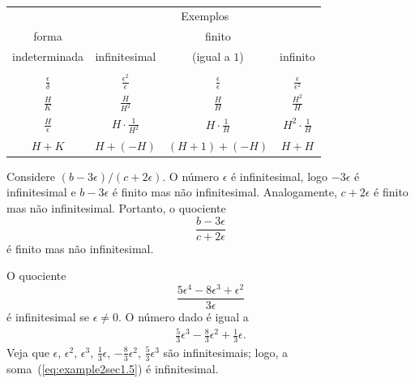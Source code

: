 \begin{table}
\caption{}
\label{tab:indeterminateforms}
\begin{center}
{\everymath{\displaystyle}
\begin{tabular}{c|c|c|c}
\hline
              & \multicolumn{3}{|c}{Exemplos} \\
\cline{2-4}
forma         &                     & finito            &          \\
indeterminada & \; infinitesimal \; & (igual a $1$)     & \; infinito \; \\
\hline & & & \\[-1.2ex]

$\frac{\epsilon}{\delta}$ &
    $\frac{\epsilon^2}{\epsilon}$ &
        $\frac{\epsilon}{\epsilon}$ &
            $\frac{\epsilon}{\epsilon^2}$ \\[2.2ex]

$\frac{H}{K}$ &
    $\frac{H}{H^2}$ &
        $\frac{H}{H}$ &
            $\frac{H^2}{H}$ \\[2.2ex]

$\frac{H}{\epsilon}$ &
    $H\cdot\frac{1}{H^2}$ &
        $H \cdot \frac{1}{H}$ &
            $H^2 \cdot \frac{1}{H}$ \\[2.2ex]

$H + K$ &
    $H + (-H)$ &
        \; $(H + 1) + (-H)$ \; &
            $H + H$ \\[2.2ex]
\hline
\end{tabular}
}
\end{center}
\end{table}

\begin{example}
Considere $(b - 3\epsilon)/(c + 2\epsilon)$. O número $\epsilon$ é
infinitesimal, logo $-3\epsilon$ é infinitesimal e $b - 3\epsilon$ é
finito mas não infinitesimal. Analogamente, $c + 2\epsilon$ é finito mas
não infinitesimal. Portanto, o quociente
$$
  \frac{b - 3\epsilon}{c + 2\epsilon}
$$
é finito mas não infinitesimal.
\end{example}

\begin{example}
O quociente
$$
  \frac{5\epsilon^4 - 8\epsilon^3 + \epsilon^2}{3\epsilon}
$$
é infinitesimal se $\epsilon \ne 0$.
O número dado é igual a
\begin{eqnarray}
  & \frac{5}{3}\epsilon^3 - \frac{8}{3}\epsilon^2 + \frac{1}{3}\epsilon. &
  \label{eq:example2sec1.5}
\end{eqnarray}
Veja que $\epsilon$, $\epsilon^2$, $\epsilon^3$, $\frac{1}{3}\epsilon$,
$-\frac{8}{3}\epsilon^2$, $\frac{5}{3}\epsilon^3$ são infinitesimais;
logo, a soma~(\ref{eq:example2sec1.5}) é infinitesimal.
\end{example}

